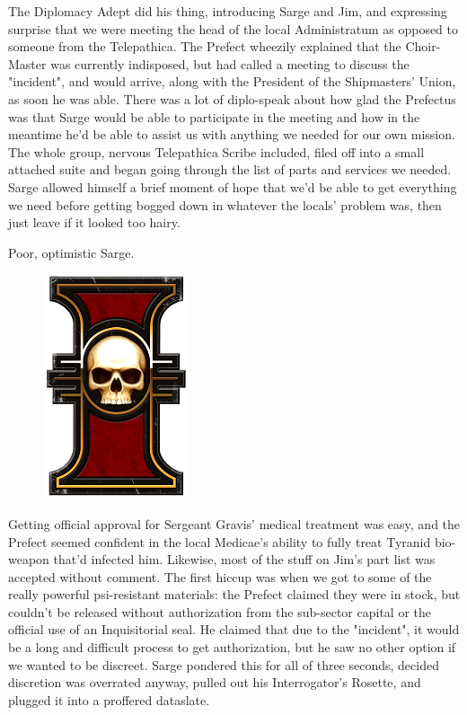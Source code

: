 The Diplomacy Adept did his thing, introducing Sarge and Jim, and expressing surprise that we were meeting the head of the local Administratum as opposed to someone from the Telepathica. 
The Prefect wheezily explained that the Choir-Master was currently indisposed, but had called a meeting to discuss the "incident", and would arrive, along with the President of the Shipmasters' Union, as soon he was able. 
There was a lot of diplo-speak about how glad the Prefectus was that Sarge would be able to participate in the meeting and how in the meantime he'd be able to assist us with anything we needed for our own mission. 
The whole group, nervous Telepathica Scribe included, filed off into a small attached suite and began going through the list of parts and services we needed. 
Sarge allowed himself a brief moment of hope that we'd be able to get everything we need before getting bogged down in whatever the locals' problem was, then just leave if it looked too hairy.

Poor, optimistic Sarge.

\begin{figure}
	\begin{center}
		\includegraphics[width=\figwidth]{pics/14/12.png}
	\end{center}
\end{figure}
Getting official approval for Sergeant Gravis' medical treatment was easy, and the Prefect seemed confident in the local Medicae's ability to fully treat Tyranid bio-weapon that'd infected him. 
Likewise, most of the stuff on Jim's part list was accepted without comment. 
The first hiccup was when we got to some of the really powerful psi-resistant materials: 
the Prefect claimed they were in stock, but couldn't be released without authorization from the sub-sector capital or the official use of an Inquisitorial seal. 
He claimed that due to the "incident", it would be a long and difficult process to get authorization, but he saw no other option if we wanted to be discreet. 
Sarge pondered this for all of three seconds, decided discretion was overrated anyway, pulled out his Interrogator's Rosette, and plugged it into a proffered dataslate.

